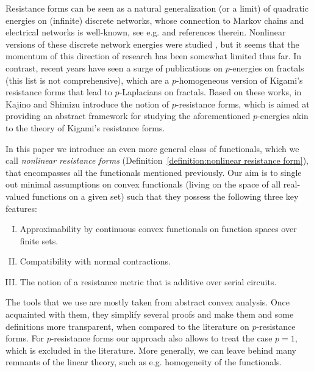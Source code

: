 \documentclass[a4paper,11pt,reqno]{amsart}
\theoremstyle{definition}
\numberwithin{equation}{section}
\newcommand{\1}{\mathds{1}}
\begin{document}
Resistance forms  can be seen as a natural generalization (or a limit) of quadratic  energies on (infinite) discrete networks, whose connection to Markov chains and electrical networks is well-known, see e.g. \cite{DS84,Soa94} and references therein. Nonlinear versions of these discrete network energies were studied \cite{MS90,Soa93,Soa93a,Soa94,Kas16,Kas20,HKO21}, but it seems that the momentum of this direction of research has been somewhat limited  thus far. In contrast, recent years have seen a surge of publications on $p$-energies on fractals \cite{HPS04,CGQ22,BL23,Kig23,GYZ23,Bau24,CGYZ24,Shi24,AB25,MS25} (this list is not comprehensive), which are a $p$-homogeneous version of Kigami's resistance forms that lead to  $p$-Laplacians on fractals. Based on these works, in \cite{KS25} Kajino and Shimizu introduce the notion of $p$-resistance forms, which is aimed at providing an abstract framework for studying the aforementioned $p$-energies akin to the theory of Kigami's resistance forms. 

In this paper we introduce an even more general class of functionals, which we call {\em nonlinear resistance forms} (Definition~\ref{definition:nonlinear resistance form}), that encompasses all the functionals mentioned previously. Our aim is to single out  minimal assumptions on convex functionals (living on the space of all real-valued functions on a given set) such that they possess the following  three key features: 
%
\begin{enumerate}[(I)]
 \item Approximability by continuous convex functionals on function spaces over finite sets. 
 \item Compatibility with normal contractions. 
 \item The notion of a resistance metric that is additive over serial circuits. 
\end{enumerate}
%
  The tools that we use are mostly taken from abstract convex analysis. Once acquainted with them, they simplify several proofs and make them and some definitions more transparent, when compared to the literature on $p$-resistance forms. For $p$-resistance forms our approach also allows to treat the case $p = 1$, which is excluded in the literature. More generally, we can leave behind many remnants of the linear theory, such as e.g. homogeneity of the functionals. 
  
\end{document}
